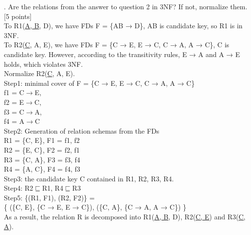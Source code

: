\documentclass[]{article}
\begin{document}
	. Are the relations from the answer to question 2 in 3NF? If not, normalize them. [5 points]   \\
	
	\noindent To R1(\underline{A, B}, D), we have FDs F = \{AB → D\}, AB is candidate key, so R1 is in 3NF.  \\
	
	\noindent To R2(\underline{C}, A, E), we have FDs F = \{C → E, E → C, C → A, A → C\}, C is candidate key. However, according to the transitivity rules, E → A and A → E holds, which violates 3NF. \\
	
	\noindent Normalize R2(\underline{C}, A, E).  \\
	
	\noindent Step1: minimal cover of F = \{C → E, E → C, C → A, A → C\}  \\
	
	f1 = C$\rightarrow$E,\\
	
	f2 = E$\rightarrow$C,\\
	
	f3 = C$\rightarrow$A, \\
	
	f4 = A$\rightarrow$C  \\
	
	\noindent Step2: Generation of relation schemas from the FDs  \\
	
	R1 = \{C, E\}, F1 = f1, f2 \\
	
	R2 = \{E, C\}, F2 = f2, f1 \\
	
	R3 = \{C, A\}, F3 = f3, f4 \\
	
	R4 = \{A, C\}, F4 = f4, f3 \\
	
	\noindent Step3: the candidate key C contained in R1, R2, R3, R4.  \\
	
	\noindent Step4: R2$\sqsubseteq$R1, R4$\sqsubseteq$R3  \\
	
	\noindent Step5: \{(R1, F1), (R2, F2)\} = \\
	
	\{
	(\{C, E\}, \{C → E, E → C\}), 
	(\{C, A\}, \{C → A, A → C\})
	\}  \\
	
	\noindent As a result, the relation R is decomposed into R1(\underline{A, B}, D), R2(\underline{C, E}) and R3(\underline{C, A}).   \\
	
\end{document}
